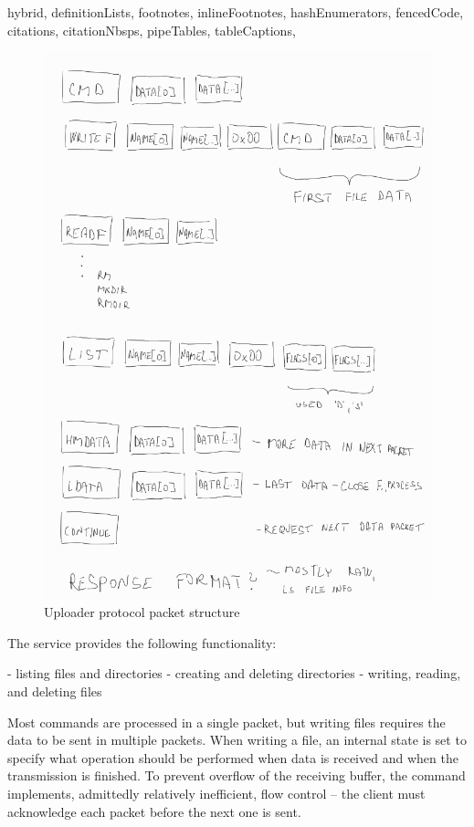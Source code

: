 \begin{markdown*}{%
  hybrid,
  definitionLists,
  footnotes,
  inlineFootnotes,
  hashEnumerators,
  fencedCode,
  citations,
  citationNbsps,
  pipeTables,
  tableCaptions,
}
\begin{figure}[ht]
    \centering
    \includegraphics[width=\textwidth]{img/uploader-protocol}
    \caption{Uploader protocol packet structure}
    \label{fig:uploader-protocol}
\end{figure}

The service provides the following functionality:

  - listing files and directories
  - creating and deleting directories
  - writing, reading, and deleting files

Most commands are processed in a single packet, but writing files requires the data to be sent in multiple packets. When writing a file, an internal state is set to specify what operation should be performed when data is received and when the transmission is finished. To prevent overflow of the receiving buffer, the command implements, admittedly relatively inefficient, flow control -- the client must acknowledge each packet before the next one is sent.


\end{markdown*}
